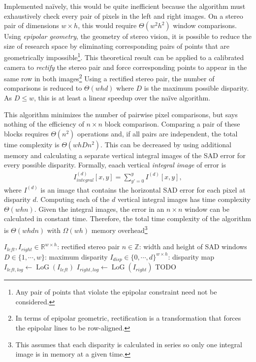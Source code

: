 \documentclass{article}
\DeclareMathOperator{\LoG}{LoG}
\begin{document}
Implemented na\"{i}vely, this would be quite inefficient because the algorithm
must exhaustively check every pair of pixels in the left and right images. On a
stereo pair of dimensions $w \times h$, this would require $\Theta(w^2 h^2)$
window comparisons. Using \textit{epipolar geometry}, the geometry of stereo
vision, it is possible to reduce the size of research space by eliminating
corresponding pairs of points that are geometrically impossible\footnote{Any
pair of points that violate the epipolar constraint need not be considered.}.
This theoretical result can be applied to a calibrated camera to
\textit{rectify} the stereo pair and force corresponding points to appear in
the same row in both images\footnote{In terms of epipolar geometric,
rectification is a transformation that forces the epipolar lines to be
row-aligned.} Using a rectified stereo pair, the number of comparisons is
reduced to $\Theta(w h d)$ where $D$ is the maximum possible disparity. As
$D \le w$, this is at least a linear speedup over the na\"{i}ve algorithm.

This algorithm minimizes the number of pairwise pixel comparisons, but says
nothing of the efficiency of $n \times n$ block comparison. Comparing a pair of
these blocks requires $\Theta(n^2)$ operations and, if all pairs are
independent, the total time complexity is $\Theta(w h D n^2)$. This can be
decreased by using additional memory and calculating a separate vertical
integral images of the SAD error for every possible disparity. Formally, eaach
vertical \textit{integral image} of error is
\begin{align*}
    I_{integral}^{(d)}[x, y] = \sum_{y' = 0}^y I^{(d)}[x, y],
\end{align*}
where $I^{(d)}$ is an image that contains the horizontal SAD error for each
pixel at disparity $d$. Computing each of the $d$ vertical integral images has
time complexity $\Theta(w h n)$. Given the integral images, the error in an $n
\times n$ window can be calculated in constant time. Therefore, the total time
complexity of the algorithm is $\Theta(w h d n)$ with $\Omega(w h)$ memory
overhead\footnote{This assumes that each disparity is calculated in series so
only one integral image is in memory at a given time.}

\begin{algorithm}
    \begin{algorithmic}
    \REQUIRE $I_{left}, I_{right} \in \mathbb{R}^{w \times h}$: rectified stereo pair
    \REQUIRE $n \in \mathbb{Z}$: width and height of SAD windows
    \REQUIRE $D \in \{1, \cdots, w\}$: maximum disparity
    \ENSURE $I_{disp} \in \{0, \cdots, d\}^{w \times h}$: disparity map
    \STATE $I_{left,log} \gets \LoG(I_{left})$
    \STATE $I_{right,log} \gets \LoG(I_{right})$
    \STATE TODO
    \ENDFOR
    \end{algorithmic}
\end{algorithm}
\end{document}
